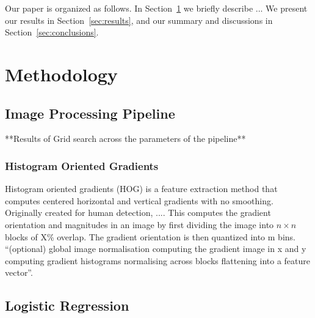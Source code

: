 \documentclass{emulateapj}
\begin{document}
Our paper is organized as follows.  In Section~\ref{sec:methods} we
briefly describe ...  We present our results in
Section~\ref{sec:results}, and our summary and discussions in
Section~\ref{sec:conclusions}.

\section{Methodology}
\label{sec:methods}

\subsection{Image Processing Pipeline}

**Results of Grid search across the parameters of the pipeline**

\subsubsection{Histogram Oriented Gradients}
Histogram oriented gradients (HOG) is a feature extraction method that
computes centered horizontal and vertical gradients with no smoothing.
Originally created for human detection, .... This computes the
gradient orientation and magnitudes in an image by first dividing the
image into $n\times n$ blocks of X\% overlap.  The gradient
orientation is then quantized into m bins. ``(optional) global image
normalisation computing the gradient image in x and y computing
gradient histograms normalising across blocks flattening into a
feature vector''\citep{dalalandtriggs_05}.




\subsection{Logistic Regression}
\end{document}
